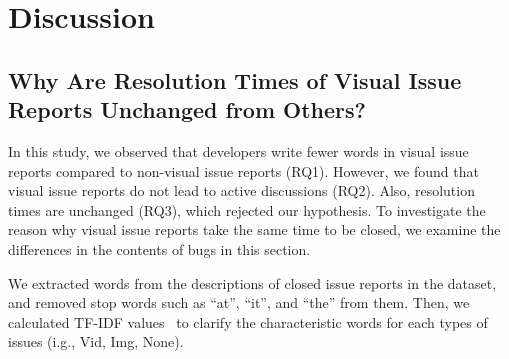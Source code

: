 \section{Discussion}
%
\subsection{Why Are Resolution Times of Visual Issue Reports Unchanged from Others?}
In this study, we observed that developers write fewer words in visual issue reports compared to non-visual issue reports (RQ1). 
However, we found that visual issue reports do not lead to active discussions (RQ2).
Also, resolution times are unchanged (RQ3), which rejected our hypothesis. 
To investigate the reason why visual issue reports take the same time to be closed, we examine the differences in the contents of bugs in this section.

We extracted words from the descriptions of closed issue reports in the dataset, and  removed stop words such as ``at'', ``it'', and ``the'' from them. 
Then, we calculated TF-IDF values~\citep{salton1988-tfidf} to clarify the characteristic words for each types of issues (i.g., Vid, Img, None). 

